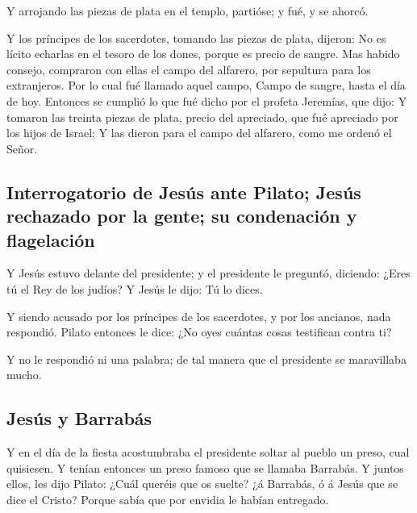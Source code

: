  Y arrojando las piezas de plata en el templo, partióse; y
fué, y se ahorcó.

 Y los príncipes de los sacerdotes, tomando las piezas de
plata, dijeron: No es lícito echarlas en el tesoro de los dones, porque
es precio de sangre.  Mas habido consejo, compraron con
ellas el campo del alfarero, por sepultura para los extranjeros.
 Por lo cual fué llamado aquel campo, Campo de sangre,
hasta el día de hoy.  Entonces se cumplió lo que fué dicho
por el profeta Jeremías, que dijo: Y tomaron las treinta piezas de
plata, precio del apreciado, que fué apreciado por los hijos de Israel;
 Y las dieron para el campo del alfarero, como me ordenó
el Señor.

\hypertarget{interrogatorio-de-jesuxfas-ante-pilato-jesuxfas-rechazado-por-la-gente-su-condenaciuxf3n-y-flagelaciuxf3n}{%
\subsection{Interrogatorio de Jesús ante Pilato; Jesús rechazado por la
gente; su condenación y
flagelación}\label{interrogatorio-de-jesuxfas-ante-pilato-jesuxfas-rechazado-por-la-gente-su-condenaciuxf3n-y-flagelaciuxf3n}}

 Y Jesús estuvo delante del presidente; y el presidente
le preguntó, diciendo: ¿Eres tú el Rey de los judíos? Y Jesús le dijo:
Tú lo dices.

 Y siendo acusado por los príncipes de los sacerdotes, y
por los ancianos, nada respondió.  Pilato entonces le
dice: ¿No oyes cuántas cosas testifican contra ti?

 Y no le respondió ni una palabra; de tal manera que el
presidente se maravillaba mucho.

\hypertarget{jesuxfas-y-barrabuxe1s}{%
\subsection{Jesús y Barrabás}\label{jesuxfas-y-barrabuxe1s}}

 Y en el día de la fiesta acostumbraba el presidente
soltar al pueblo un preso, cual quisiesen.  Y tenían
entonces un preso famoso que se llamaba Barrabás.  Y
juntos ellos, les dijo Pilato: ¿Cuál queréis que os suelte? ¿á Barrabás,
ó á Jesús que se dice el Cristo?  Porque sabía que por
envidia le habían entregado.

